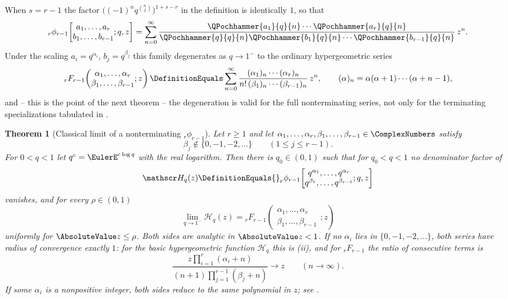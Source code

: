 \documentclass[11pt,a4paper,oneside,openany]{book}
\newtheorem{theorem}{Theorem}[chapter]
\theoremstyle{definition}
\theoremstyle{remark}
\begin{document}
When $s=r-1$ the factor $\bigl((-1)^nq^{\binom n2}\bigr)^{1+s-r}$ in the definition is identically $1$, so that
\[
 {}_r\phi_{r-1}\!\left[
 \begin{matrix}a_1,\dots,a_r\\ b_1,\dots,b_{r-1}\end{matrix};q,z\right]
 =\sum_{n=0}^{\infty}
 \frac{\QPochhammer{a_1}{q}{n}\cdots\QPochhammer{a_r}{q}{n}}
      {\QPochhammer{q}{q}{n}\QPochhammer{b_1}{q}{n}\cdots\QPochhammer{b_{r-1}}{q}{n}}\,z^n .
\]
Under the scaling $a_i=q^{\alpha_i}$, $b_j=q^{\beta_j}$ this family degenerates as $q\to1^-$ to the ordinary hypergeometric series
\[
 {}_rF_{r-1}\!\left(
 \begin{matrix}\alpha_1,\dots,\alpha_r\\ \beta_1,\dots,\beta_{r-1}\end{matrix};z\right)
 \DefinitionEquals\sum_{n=0}^{\infty}
 \frac{(\alpha_1)_n\cdots(\alpha_r)_n}
      {n!\,(\beta_1)_n\cdots(\beta_{r-1})_n}\,z^n,
 \qquad
 (\alpha)_n=\alpha(\alpha+1)\cdots(\alpha+n-1),
\]
and -- this is the point of the next theorem -- the degeneration is valid for the full nonterminating series, not only for the terminating specializations tabulated in .

\begin{theorem}[Classical limit of a nonterminating ${}_r\phi_{r-1}$]\label{thm:classical-hypergeometric-limit}
Let $r\ge1$ and let $\alpha_1,\dots,\alpha_r,\beta_1,\dots,\beta_{r-1}\in\ComplexNumbers$ satisfy
\[
 \beta_j\notin\{0,-1,-2,\dots\}\qquad(1\le j\le r-1).
\]
For $0<q<1$ let $q^{c}=\EulerE^{c\log q}$ with the real logarithm.  Then there is $q_0\in(0,1)$ such that for $q_0<q<1$ no denominator factor of
\[
 \mathscr H_q(z)\DefinitionEquals
 {}_r\phi_{r-1}\!\left[
 \begin{matrix}q^{\alpha_1},\dots,q^{\alpha_r}\\
               q^{\beta_1},\dots,q^{\beta_{r-1}}\end{matrix};q,z\right]
\]
vanishes, and for every $\rho\in(0,1)$
\[
 \lim_{q\to1^-}\mathscr H_q(z)
 ={}_rF_{r-1}\!\left(
 \begin{matrix}\alpha_1,\dots,\alpha_r\\ \beta_1,\dots,\beta_{r-1}\end{matrix};z\right)
\]
uniformly for $\AbsoluteValue z\le\rho$.  Both sides are analytic in $\AbsoluteValue z<1$.  If no $\alpha_i$ lies in $\{0,-1,-2,\dots\}$, both series have radius of convergence exactly $1$: for the basic hypergeometric function $\mathscr H_q$ this is (ii), and for ${}_rF_{r-1}$ the ratio of consecutive terms is
\[
 \frac{z\prod_{i=1}^{r}(\alpha_i+n)}{(n+1)\prod_{j=1}^{r-1}(\beta_j+n)}\longrightarrow z
 \qquad(n\to\infty).
\]
If some $\alpha_i$ is a nonpositive integer, both sides reduce to the same polynomial in $z$; see .
\end{theorem}
\end{document}
